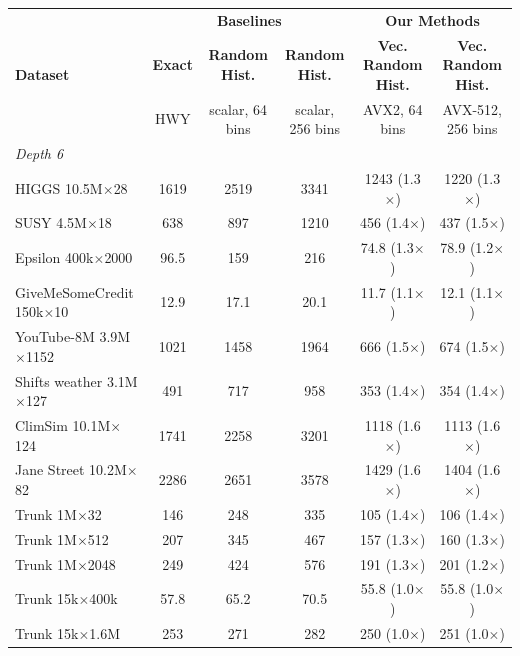 \begin{table}[p]
    \centering
    \footnotesize
    \setlength{\tabcolsep}{2.5pt}
    \begin{tabular}{l|ccc|cc}
        \hline
        \multirow{3}{*}{\textbf{Dataset}} & \multicolumn{3}{c|}{\textbf{Baselines}} & \multicolumn{2}{c}{\textbf{Our Methods}} \\
         & \textbf{Exact} & \textbf{Random Hist.} & \textbf{Random Hist.} & \textbf{Vec. Random Hist.} & \textbf{Vec. Random Hist.} \\
         & \scriptsize HWY & \scriptsize scalar, 64 bins & \scriptsize scalar, 256 bins & \scriptsize AVX2, 64 bins & \scriptsize AVX-512, 256 bins \\
        \hline
        \multicolumn{6}{l}{\textit{Depth 6}} \\
        HIGGS 10.5M$\times$28 & 1619 & 2519 & 3341 & 1243 (1.3$\times$) & 1220 (1.3$\times$) \\
        SUSY 4.5M$\times$18 & 638 & 897 & 1210 & 456 (1.4$\times$) & 437 (1.5$\times$) \\
        Epsilon 400k$\times$2000 & 96.5 & 159 & 216 & 74.8 (1.3$\times$) & 78.9 (1.2$\times$) \\
        GiveMeSomeCredit 150k$\times$10 & 12.9 & 17.1 & 20.1 & 11.7 (1.1$\times$) & 12.1 (1.1$\times$) \\
        YouTube-8M 3.9M$\times$1152 & 1021 & 1458 & 1964 & 666 (1.5$\times$) & 674 (1.5$\times$) \\
        Shifts weather 3.1M$\times$127 & 491 & 717 & 958 & 353 (1.4$\times$) & 354 (1.4$\times$) \\
        ClimSim 10.1M$\times$124 & 1741 & 2258 & 3201 & 1118 (1.6$\times$) & 1113 (1.6$\times$) \\
        Jane Street 10.2M$\times$82 & 2286 & 2651 & 3578 & 1429 (1.6$\times$) & 1404 (1.6$\times$) \\
        Trunk 1M$\times$32 & 146 & 248 & 335 & 105 (1.4$\times$) & 106 (1.4$\times$) \\
        Trunk 1M$\times$512 & 207 & 345 & 467 & 157 (1.3$\times$) & 160 (1.3$\times$) \\
        Trunk 1M$\times$2048 & 249 & 424 & 576 & 191 (1.3$\times$) & 201 (1.2$\times$) \\
        Trunk 15k$\times$400k & 57.8 & 65.2 & 70.5 & 55.8 (1.0$\times$) & 55.8 (1.0$\times$) \\
        Trunk 15k$\times$1.6M & 253 & 271 & 282 & 250 (1.0$\times$) & 251 (1.0$\times$) \\

\end{tabular}
\end{table}
